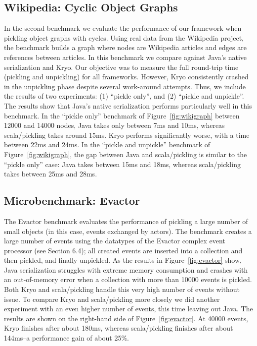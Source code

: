 \documentclass[preprint,10pt]{sigplanconf}
\theoremstyle{definition}
\theoremstyle{definition}
\begin{document}
\subsection{Wikipedia: Cyclic Object Graphs}

In the second benchmark we evaluate the performance of our framework when
pickling object graphs with cycles. Using real data from the Wikipedia
project, the benchmark builds a graph where nodes are Wikipedia articles and
edges are references between articles. In this benchmark we compare against
Java's native serialization and Kryo. Our objective was to measure the full
round-trip time (pickling and unpickling) for all frameworks. However, Kryo
consistently crashed in the unpickling phase despite several work-around
attempts. Thus, we include the results of two experiments: (1) ``pickle
only'', and (2) ``pickle and unpickle''. The results show that Java's native
serialization performs particularly well in this benchmark. In the ``pickle
only'' benchmark of Figure~\ref{fig:wikigraph} between 12000 and 14000 nodes, Java takes only between 7ms and
10ms, whereas scala/pickling takes around 15ms. Kryo performs significantly
worse, with a time between 22ms and 24ms. In the ``pickle and unpickle''
benchmark of Figure~\ref{fig:wikigraph}, the gap between Java and scala/pickling is similar to the ``pickle
only'' case: Java takes between 15ms and 18ms, whereas scala/pickling takes
between 25ms and 28ms.

\subsection{Microbenchmark: Evactor}

The Evactor benchmark evaluates the performance of pickling a large number of
small objects (in this case, events exchanged by actors). The benchmark
creates a large number of events using the datatypes of the Evactor complex
event processor  (see Section 6.4); all created events are inserted into a
collection and then pickled, and finally unpickled. As the results in
Figure~\ref{fig:evactor} show, Java serialization struggles with extreme memory
consumption and crashes with an out-of-memory error when a collection with
more than 10000 events is pickled. Both Kryo and scala/pickling handle this
very high number of events without issue. To compare Kryo and scala/pickling
more closely we did another experiment with an even higher number of events,
this time leaving out Java. The results are shown on the right-hand side of
Figure~\ref{fig:evactor}. At 40000 events, Kryo finishes after about 180ms, whereas
scala/pickling finishes after about 144ms--a performance gain of about 25\%.
\end{document}
